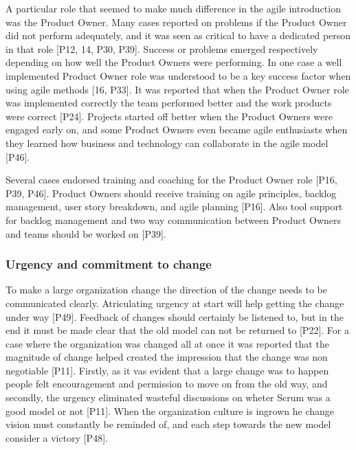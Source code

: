 \documentclass[preprint,authoryear,12pt]{elsarticle}
\begin{document}

A particular role that seemed to make much difference in the agile introduction
was the Product Owner. Many cases reported on problems if the Product Owner did
not perform adequately, and it was seen as critical to have a dedicated person
in that role [P12, 14, P30, P39].
Success or problems emerged respectively depending on how well the Product
Owners were performing. In one case a well implemented Product Owner role was
understood to be a key success factor when using agile methods [16, P33].
It was reported that when the Product Owner role was implemented correctly the
team performed better and the work products were correct [P24]. Projects started
off better when the Product Owners were engaged early on, and some Product
Owners even became agile enthusiasts when they learned how business and
technology can collaborate in the agile model [P46].

Several cases endorsed training and coaching for the Product Owner role [P16,
P39, P46]. Product Owners should receive training on agile principles, backlog
management, user story breakdown, and agile planning [P16]. Also tool support
for backlog management and two way communication between Product Owners and
teams should be worked on [P39].


\subsubsection{Urgency and commitment to change}



To make a large organization change the direction of the change needs to be
communicated clearly. Atriculating urgency at start will help getting the change
under way [P49]. Feedback of changes should certainly be listened to, but in the
end it must be made clear that the old model can not be returned to [P22].
For a case where the organization was changed all at once it was reported that
the magnitude of change helped created the impression that the change was non
negotiable [P11]. Firstly, as it vas evident that a large change was to happen
people felt encouragement and permission to move on from the old way, and
secondly, the urgency eliminated wasteful discussions on wheter Scrum was a good
model or not [P11].
When the organization culture is ingrown he change vision must constantly be
reminded of, and each step towards the new model consider a victory [P48].
\end{document}
